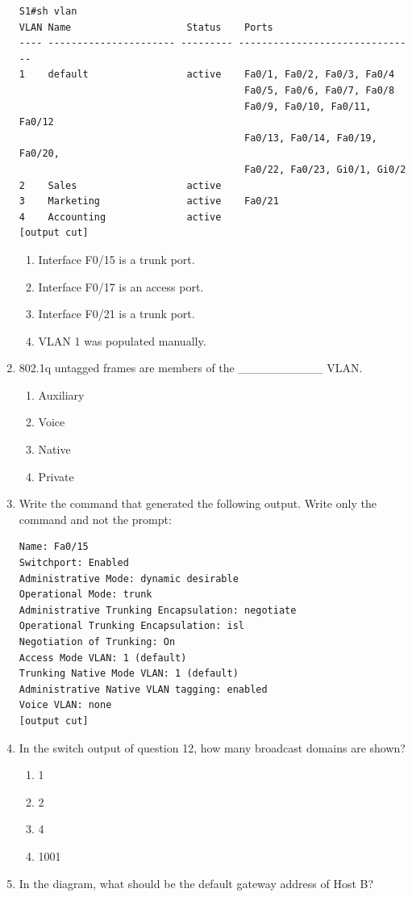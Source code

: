 \begin{enumerate}
\begin{verbatim}
S1#sh vlan
VLAN Name                    Status    Ports
---- ---------------------- --------- -------------------------------
1    default                 active    Fa0/1, Fa0/2, Fa0/3, Fa0/4
                                       Fa0/5, Fa0/6, Fa0/7, Fa0/8
                                       Fa0/9, Fa0/10, Fa0/11, Fa0/12
                                       Fa0/13, Fa0/14, Fa0/19, Fa0/20,
                                       Fa0/22, Fa0/23, Gi0/1, Gi0/2
2    Sales                   active
3    Marketing               active    Fa0/21
4    Accounting              active
[output cut]
\end{verbatim}

  \begin{enumerate}
  \tightlist
  \item
    Interface F0/15 is a trunk port.
  \item
    Interface F0/17 is an access port.
  \item
    Interface F0/21 is a trunk port.
  \item
    VLAN 1 was populated manually.
  \end{enumerate}
\item
  802.1q untagged frames are members of the \_\_\_\_\_\_\_\_\_\_ VLAN.

  \begin{enumerate}
  \tightlist
  \item
    Auxiliary
  \item
    Voice
  \item
    Native
  \item
    Private
  \end{enumerate}
\item
   Write the command
  that generated the following output. Write only the command and not
  the prompt:

\begin{verbatim}
Name: Fa0/15
Switchport: Enabled
Administrative Mode: dynamic desirable
Operational Mode: trunk
Administrative Trunking Encapsulation: negotiate
Operational Trunking Encapsulation: isl
Negotiation of Trunking: On
Access Mode VLAN: 1 (default)
Trunking Native Mode VLAN: 1 (default)
Administrative Native VLAN tagging: enabled
Voice VLAN: none
[output cut]
\end{verbatim}
\item
  In the switch output of question 12, how many broadcast domains are
  shown?

  \begin{enumerate}
  \tightlist
  \item
    1
  \item
    2
  \item
    4
  \item
    1001
  \end{enumerate}
\item
  In the diagram, what should be the default gateway address of Host B?


\end{enumerate}
